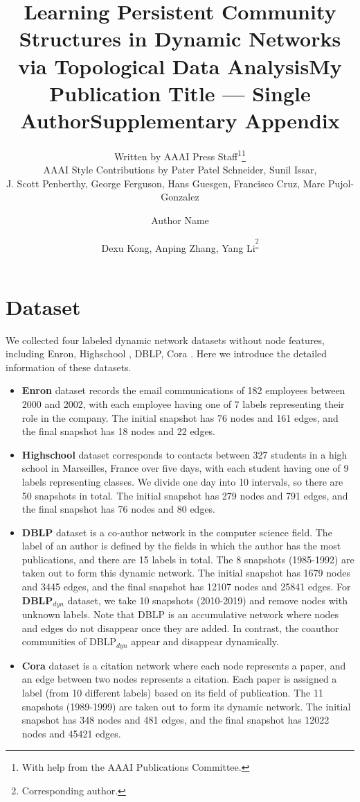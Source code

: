 \documentclass[letterpaper]{article} %
\title{Learning Persistent Community Structures in Dynamic Networks \\via Topological Data Analysis}
\author{
    Written by AAAI Press Staff\textsuperscript{\rm 1}\thanks{With help from the AAAI Publications Committee.}\\
    AAAI Style Contributions by Pater Patel Schneider,
    Sunil Issar,\\
    J. Scott Penberthy,
    George Ferguson,
    Hans Guesgen,
    Francisco Cruz\equalcontrib,
    Marc Pujol-Gonzalez\equalcontrib
}
\title{My Publication Title --- Single Author}
\author {
    Author Name
}
\title{Supplementary Appendix}
\author {
    Dexu Kong,
    Anping Zhang,
    Yang Li\textsuperscript{\footnote{Corresponding author.}}
}
\begin{document}
\maketitle
\appendix
\newcommand{\beginsupplement}{%
        \setcounter{table}{0}
        \renewcommand{\thetable}{S\arabic{table}}%
        \setcounter{figure}{0}
        \renewcommand{\thefigure}{S\arabic{figure}}%
     }
\renewcommand{\thealgorithm}{S\arabic{algorithm}}
\renewcommand{\figurename}{Fig.}
\beginsupplement

\section{Dataset}
We collected four labeled dynamic network datasets without node features, including Enron, Highschool \cite{crawford2018cluenet}, DBLP, Cora \cite{hou2020glodyne}. Here we introduce the detailed information of these datasets.
\begin{itemize}
    \item \textbf{Enron} dataset records the email communications of 182 employees between 2000 and 2002, with each employee having one of 7 labels representing their role in the company. The initial snapshot has 76 nodes and 161 edges, and the final snapshot has 18 nodes and 22 edges. 
    \item \textbf{Highschool} dataset corresponds to contacts between 327 students in a high school in Marseilles, France over five days, with each student having one of 9 labels representing classes. We divide one day into 10 intervals, so there are 50 snapshots in total. The initial snapshot has 279 nodes and 791 edges, and the final snapshot has 76 nodes and 80 edges. 
    \item \textbf{DBLP} dataset is a co-author network in the computer science field. The label of an author is defined by the fields in which the author has the most publications, and there are 15 labels in total. The 8 snapshots (1985-1992) are taken out to form this dynamic network. The initial snapshot has 1679 nodes and 3445 edges, and the final snapshot has 12107 nodes and 25841 edges. For \textbf{DBLP$_{dyn}$} dataset, we take 10 snapshots (2010-2019) and remove nodes with unknown labels. Note that DBLP is an accumulative network where nodes and edges do not disappear once they are added. In contrast, the coauthor communities of DBLP$_{dyn}$ appear and disappear dynamically.
    \item \textbf{Cora} dataset is a citation network where each node represents a paper, and an edge between two nodes represents a citation. Each paper is assigned a label (from 10 different labels) based on its field of publication. The 11 snapshots (1989-1999) are taken out to form its dynamic network. The initial snapshot has 348 nodes and 481 edges, and the final snapshot has 12022 nodes and 45421 edges. 
\end{itemize}
\end{document}
